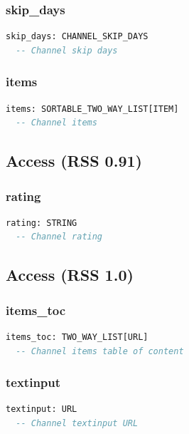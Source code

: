 \subsubsection{skip\_days}

\begin{lstlisting}[language=Eiffel]
skip_days: CHANNEL_SKIP_DAYS
  -- Channel skip days
\end{lstlisting}

\subsubsection{items}

\begin{lstlisting}[language=Eiffel]
items: SORTABLE_TWO_WAY_LIST[ITEM]
  -- Channel items
\end{lstlisting}

\subsection{Access (RSS 0.91)}
\label{sec:channel-access-rss091}

\subsubsection{rating}

\begin{lstlisting}[language=Eiffel]
rating: STRING
  -- Channel rating
\end{lstlisting}

\subsection{Access (RSS 1.0)}
\label{sec:channel-access-rss10}

\subsubsection{items\_toc}

\begin{lstlisting}[language=Eiffel]
items_toc: TWO_WAY_LIST[URL]
  -- Channel items table of content
\end{lstlisting}

\subsubsection{textinput}

\begin{lstlisting}[language=Eiffel]
textinput: URL
  -- Channel textinput URL
\end{lstlisting}



